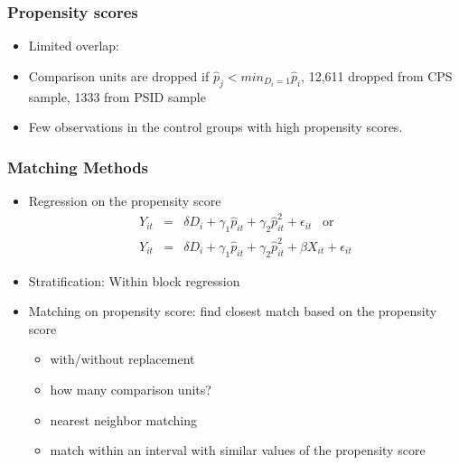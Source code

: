 \documentclass[notes=show,beamer,compress]{beamer}
\begin{document}
\begin{frame}
\frametitle{Propensity scores}

\begin{itemize}

\item  Limited overlap:
\item  Comparison units are dropped if $\hat{p}_j < min_{D_i=1}\hat{p}_i$, 12,611 dropped from CPS sample, 1333 from PSID sample
\item  Few observations in the control groups with high propensity scores.
\end{itemize} 

\end{frame}


\begin{frame}
\frametitle{Matching Methods}


\begin{itemize}
\item Regression on the propensity score
\begin{eqnarray*}
Y_{it}&=& \delta D_i +  \gamma_1 \hat{p}_{it} +  \gamma_2 \hat{p}^2_{it} +  \epsilon_{it} \;\;\; \text{or}  \\
Y_{it}&=& \delta D_i +  \gamma_1 \hat{p}_{it} +  \gamma_2 \hat{p}^2_{it} +  \beta X_{it}+  \epsilon_{it}
\end{eqnarray*}
\item Stratification: Within block regression
\item Matching on propensity score: find closest match based on the propensity score
	\begin{itemize}
		\item with/without replacement
		\item how many comparison units?
		\item nearest neighbor matching
		\item match within an interval with similar values of the propensity score
	\end{itemize}

\end{itemize}

\end{frame}

\end{document}
